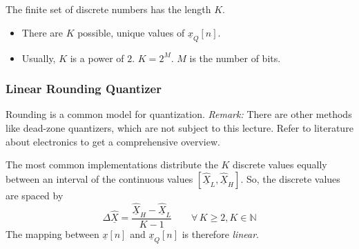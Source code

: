 \begin{refsection}
The finite set of discrete numbers has the length $K$.
\begin{itemize}
	\item There are $K$ possible, unique values of $\underline{x}_Q[n]$.
	\item Usually, $K$ is a power of $2$. $K = 2^M$. $M$ is the number of bits.
\end{itemize}

\subsubsection{Linear Rounding Quantizer}

Rounding is a common model for quantization. \textit{Remark:} There are other methods like dead-zone quantizers, which are not subject to this lecture. Refer to literature about electronics to get a comprehensive overview.

The most common implementations distribute the $K$ discrete values equally between an interval of the continuous values $[\underline{\hat{X}}_L, \underline{\hat{X}}_H]$. So, the discrete values are spaced by
\begin{equation}
	\Delta \underline{\hat{X}} = \frac{\underline{\hat{X}}_H - \underline{\hat{X}}_L}{K - 1} \qquad \forall \, K \geq 2, K \in \mathbb{N}
\end{equation}
The mapping between $\underline{x}[n]$ and $\underline{x}_Q[n]$ is therefore \emph{linear}.


\end{refsection}
